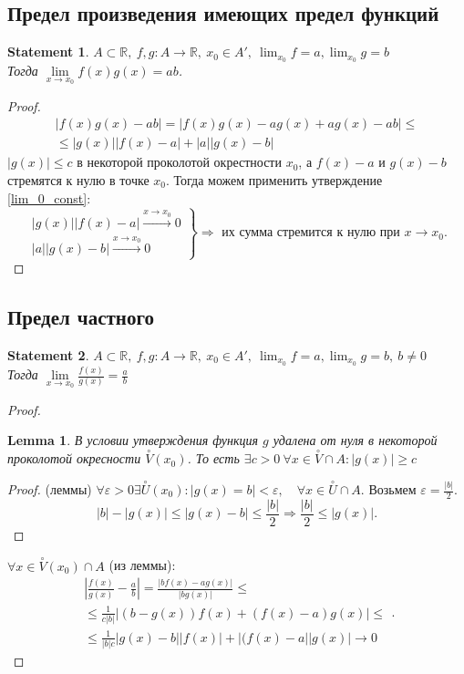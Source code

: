 \documentclass[11pt]{book}
\newcommand{\R}{\mathbb{R}}
\renewcommand{\le}{\leqslant}
\renewcommand{\ge}{\geqslant}
\theoremstyle{definition}
\theoremstyle{plain}
\theoremstyle{plain}
\newtheorem*{lm}{Lemma}
\newtheorem*{st}{Statement}
\theoremstyle{definition}
\theoremstyle{remark}
\begin{document}
\subsection{Предел произведения имеющих предел функций}\label{ques_22}
\begin{st}
    $A \subset \R, ~f, g: A \to \R, ~ x_0 \in A' , ~ \lim_{x_0} f= a, \lim_{x_0} g =b$\\
    Тогда $\lim\limits_{x \to  x_0} f(x) g(x) = ab$.
\end{st}
\begin{proof}
    \[
	\begin{array}{c}
	    |f(x)g(x) -ab| = |f(x)g(x) - a g(x) + a g(x) - ab| \le \\
	    \le |g(x)||f(x)-a| + |a||g(x) - b|
    \end{array}
   \] 
   $|g(x)| \le c$ в некоторой проколотой окрестности $x_0$, а $f(x) - a$ и $g(x) -b$ стремятся к нулю в точке $x_0$. Тогда можем применить утверждение \ref{lim_0_const}:
   \[
   \left .
   \begin{array}{l}
       |g(x)||f(x) - a|  \stackrel{x \to  x_0} \longrightarrow  0\\
       |a||g(x) - b|  \stackrel{x \to  x_0} \longrightarrow  0
   \end{array}
   \right \} \Rightarrow \mbox{ их сумма стремится к нулю при $x \to x_0$}
   .\] 
\end{proof}
\subsection{Предел частного}\label{ques_23}
\begin{st}
    $A \subset \R, ~f, g: A \to \R, ~ x_0 \in A' , ~ \lim_{x_0} f= a, \lim_{x_0} g =b, ~b\ne 0$\\
    Тогда $\lim\limits_{x \to x_0}  \frac{f(x)}{g(x)} = \frac{a}{b}$
\end{st}
\begin{proof}
    \begin{lm}
	В условии утверждения функция $g$ удалена от нуля в некоторой проколотой окресности  $\stackrel \circ V(x_0)$. То есть $\exists c > 0 ~\forall x \in \stackrel \circ V \cap A : |g(x)| \ge c$
    \end{lm}
    \begin{proof}{(леммы)}
	$\forall \varepsilon >0 \exists \stackrel \circ U(x_0) : |g(x) = b| < \varepsilon , \quad \forall  x \in \stackrel \circ U \cap A$. Возьмем $\varepsilon =\frac{|b|}{2}$. \[
	    |b| - |g(x)| \le |g(x) - b| \le \frac{|b|}{2} \Longrightarrow \frac{|b|}{2} \le |g(x)|
	.\] 
    \end{proof}
    $\forall x \in \stackrel \circ V(x_0) \cap A$ (из леммы):
    \[
    \begin{array}{c}
	|\frac{f(x)}{g(x)} - \frac{a}{b}| = \frac{|b f(x) - a g(x)|}{|b g(x)|} \le \\
	\le \frac{1}{c |b|} |(b-g(x))f(x) + (f(x) - a) g(x)| \le\\
	\le\frac{1}{|b|c} |g(x) - b| |f(x)| + |(f(x) - a||g(x)| \longrightarrow 0
    \end{array}
    .\] 
\end{proof}
\end{document}
